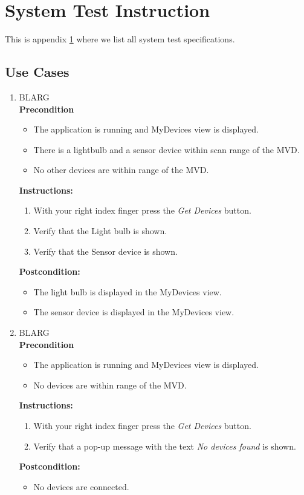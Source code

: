 \documentclass[a4paper]{article}
\newlength{\testlabellength}
\newenvironment{testlist}{\begin{enumerate}[label=\bfseries Instruction \thesubsection.\arabic* , labelindent=0pt, labelwidth=\testlabellength , leftmargin=2cm]}{\end{enumerate}}
\newenvironment{precondition}{
{\color{white}BLARG}\\ 
\textbf{Precondition}
\begin{itemize}[labelindent=0cm, labelwidth=2cm , leftmargin=1cm]
}
{\end{itemize}}
\newenvironment{instruction}{
\textbf{Instructions:}
\begin{enumerate}[label=\bfseries  \arabic*., labelindent=0cm, labelwidth=2cm , leftmargin=1cm]
}
{\end{enumerate}}
\newenvironment{postcondition}{
\textbf{Postcondition:}
\begin{itemize}[labelindent=0cm, labelwidth=2cm , leftmargin=1cm]
}
{\end{itemize}}
\begin{document}
\begin{appendices}
\begin{testlist}
\end{testlist}	

\newpage

\section{System Test Instruction} \label{appendix:section:systemtest}
This is appendix \ref{appendix:section:systemtest} where we list all system test specifications.

\subsection{Use Cases}
\begin{testlist}
	\item 
		\begin{precondition}
			\item The application is running and MyDevices view is displayed.
			\item There is a lightbulb and a sensor device within scan range of the MVD.
			\item No other devices are within range of the MVD.
		\end{precondition}
		\begin{instruction}
			\item With your right index finger press the \emph{Get Devices} button.
			\item Verify that the Light bulb is shown.
			\item Verify that the Sensor device is shown.
		\end{instruction}
		\begin{postcondition}
			\item The light bulb is displayed in the MyDevices view.
		 	\item The sensor device is displayed in the MyDevices view.
		\end{postcondition}

	\item 
		\begin{precondition}
			\item The application is running and MyDevices view is displayed.
			\item No devices are within range of the MVD.
		\end{precondition}
		\begin{instruction}
			\item With your right index finger press the \emph{Get Devices} button.
			\item Verify that a pop-up message with the text \emph{No devices found} is shown.
		\end{instruction}
		\begin{postcondition}
			\item No devices are connected.
		\end{postcondition}
	

\end{testlist}
\end{appendices}
\end{document}
